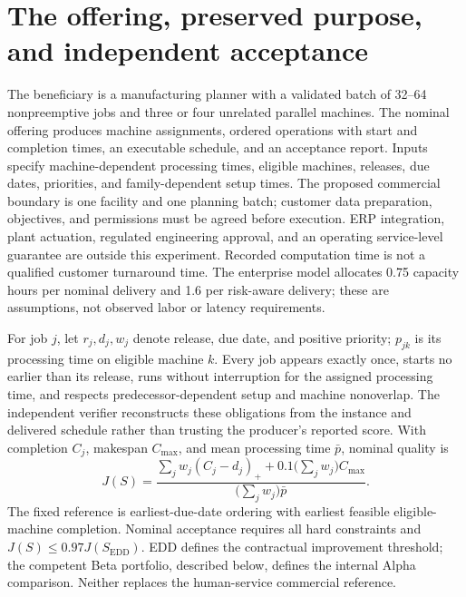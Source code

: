 \section{The offering, preserved purpose, and independent acceptance}
\label{sec:methods-offering}

The beneficiary is a manufacturing planner with a validated batch of 32--64 nonpreemptive jobs and three or four unrelated parallel machines. The nominal offering produces machine assignments, ordered operations with start and completion times, an executable schedule, and an acceptance report. Inputs specify machine-dependent processing times, eligible machines, releases, due dates, priorities, and family-dependent setup times. The proposed commercial boundary is one facility and one planning batch; customer data preparation, objectives, and permissions must be agreed before execution. ERP integration, plant actuation, regulated engineering approval, and an operating service-level guarantee are outside this experiment. Recorded computation time is not a qualified customer turnaround time. The enterprise model allocates 0.75 capacity hours per nominal delivery and 1.6 per risk-aware delivery; these are assumptions, not observed labor or latency requirements.

For job $j$, let $r_j,d_j,w_j$ denote release, due date, and positive priority; $p_{jk}$ is its processing time on eligible machine $k$. Every job appears exactly once, starts no earlier than its release, runs without interruption for the assigned processing time, and respects predecessor-dependent setup and machine nonoverlap. The independent verifier reconstructs these obligations from the instance and delivered schedule rather than trusting the producer's reported score. With completion $C_j$, makespan $C_{\max}$, and mean processing time $\bar p$, nominal quality is
\begin{equation}
 J(S)=\frac{\sum_j w_j(C_j-d_j)_+ +0.1\bigl(\sum_jw_j\bigr)C_{\max}}
 {\bigl(\sum_jw_j\bigr)\bar p}.
 \label{eq:nominal-objective}
\end{equation}
The fixed reference is earliest-due-date ordering with earliest feasible eligible-machine completion. Nominal acceptance requires all hard constraints and $J(S)\leq0.97J(S_{\mathrm{EDD}})$. EDD defines the contractual improvement threshold; the competent Beta portfolio, described below, defines the internal Alpha comparison. Neither replaces the human-service commercial reference.

